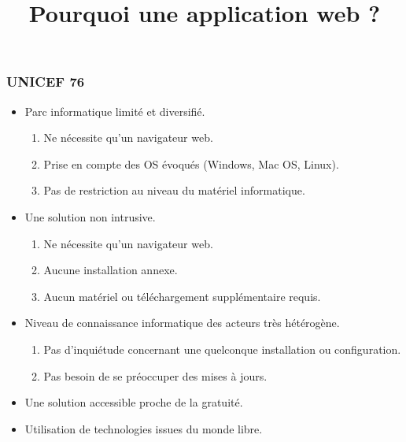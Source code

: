 \subsection{} %

\title{Pourquoi une application web ?}

\begin{frame}
  \frametitle{UNICEF 76}
  \begin{itemize}
    \item Parc informatique limité et diversifié.
      \begin{enumerate}
        \item Ne nécessite qu'un navigateur web.
        \item Prise en compte des OS évoqués (Windows, Mac OS, Linux).
        \item Pas de restriction au niveau du matériel informatique.
      \end{enumerate}
    \item Une solution non intrusive.
      \begin{enumerate}
        \item Ne nécessite qu'un navigateur web.
        \item Aucune installation annexe.
        \item Aucun matériel ou téléchargement supplémentaire requis.
      \end{enumerate}
    \item Niveau de connaissance informatique des acteurs très hétérogène.
      \begin{enumerate}
        \item Pas d'inquiétude concernant une quelconque installation ou configuration.
        \item Pas besoin de se préoccuper des mises à jours.  
      \end{enumerate}
    \item Une solution accessible proche de la gratuité.
    \item Utilisation de technologies issues du monde libre.
  \end{itemize}
\end{frame}

\subsection{}


\speaker{\matthieu}
\subsection{}


